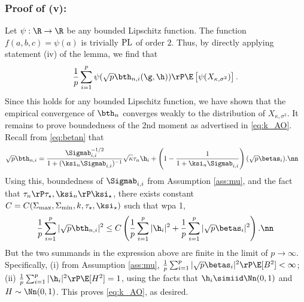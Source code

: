 \subsubsection{Proof of (v):} Let $\psi:\R\rightarrow\R$ be any bounded Lipschitz function. The function $f(a,b,c) = \psi(a)$ is trivially $\rm{PL}$ of order $2$. Thus, by directly applying statement (iv) of the lemma, we find that
$$
\frac{1}{p}\sum_{i=1}^p{\psi(\sqrt{p}\bth_{n,i}(\g,\h))} \rP \E\left[\psi(X_{\kappa,\sigma^2})\right].
$$
Since this holds for any bounded Lipschitz function, we have shown that the empirical convergence of $\bth_n$ converges weakly to the distribution of $X_{\kappa,\sigma^2}$. It remains to prove boundedness of the $2$nd moment as advertised in \eqref{eq:k_AO}. Recall  from
\eqref{eq:betan} that
\begin{align}
\sqrt{p}\bth_{n,i}&=\frac{{\Sigmab_{i,i}^{-1/2}}}{1+(\ksi_n\Sigmab_{i,i})^{-1}}\sqrt{\kappa}\tau_n\h_i +\left(1-\frac{1}{1+\ksi_n\Sigmab_{i,i}}\right)(\sqrt{p}\betas_i).\nn
\end{align}
Using this, boundedness of $\Sigmab_{i,i}$ from Assumption \ref{ass:mu}, and the fact that $\tau_n\rP\tau_\star, \ksi_n\rP\ksi_\star$, there exists constant $C=C(\Sigma_{\max},\Sigma_{\min},k,\tau_\star,\ksi_\star)$ such that wpa 1,
\begin{align}
\frac{1}{p}\sum_{i=1}^p|\sqrt{p}\bth_{n,i}|^{2} \leq C\left(\frac{1}{p}\sum_{i=1}^p|\h_{i}|^{2}+\frac{1}{p}\sum_{i=1}^p|\sqrt{p}\betas_{i}|^{2}\right).\nn
\end{align}
But the two summands in the expression above are finite in the limit of $p\rightarrow\infty$. Specifically, (i) from Assumption \ref{ass:mu}, $\frac{1}{p}\sum_{i=1}^p|\sqrt{p}\betas_{i}|^{2}\rP\E[B^{2}]<\infty$; (ii) $\frac{1}{p}\sum_{i=1}^p|\h_{i}|^{2}\rP\E[H^{2}]=1$, using the facts that $\h_i\simiid\Nn(0,1)$ and $H\sim\Nn(0,1)$. This proves \eqref{eq:k_AO}, as desired.

